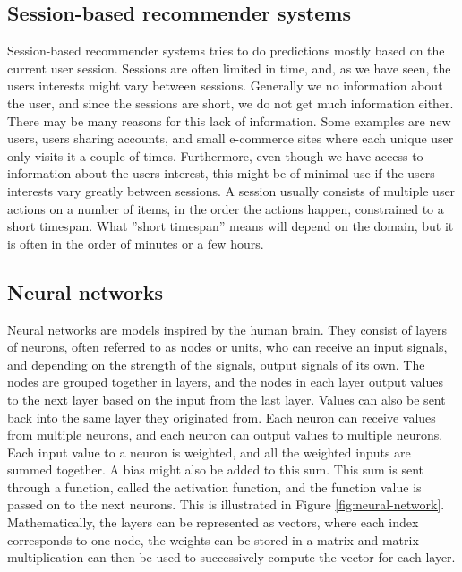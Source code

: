 \subsection{Session-based recommender systems}
Session-based recommender systems tries to do predictions mostly based on the current user session. Sessions are often limited in time, and, as we have seen, the users interests might vary between sessions. Generally we no information about the user, and since the sessions are short, we do not get much information either. There may be many reasons for this lack of information. Some examples are new users, users sharing accounts, and small e-commerce sites where each unique user only visits it a couple of times. Furthermore, even though we have access to information about the users interest, this might be of minimal use if the users interests vary greatly between sessions. A session usually consists of multiple user actions on a number of items, in the order the actions happen, constrained to a short timespan. What ''short timespan'' means will depend on the domain, but it is often in the order of minutes or a few hours.

\subsection{Neural networks}
Neural networks are models inspired by the human brain. They consist of layers of neurons, often referred to as nodes or units, who can receive an input signals, and depending on the strength of the signals, output signals of its own. The nodes are grouped together in layers, and the nodes in each layer output values to the next layer based on the input from the last layer. Values can also be sent back into the same layer they originated from. Each neuron can receive values from multiple neurons, and each neuron can output values to multiple neurons. Each input value to a neuron is weighted, and all the weighted inputs are summed together. A bias might also be added to this sum. This sum is sent through a function, called the activation function, and the function value is passed on to the next neurons. This is illustrated in Figure \ref{fig:neural-network}. Mathematically, the layers can be represented as vectors, where each index corresponds to one node, the weights can be stored in a matrix and matrix multiplication can then be used to successively compute the vector for each layer.

